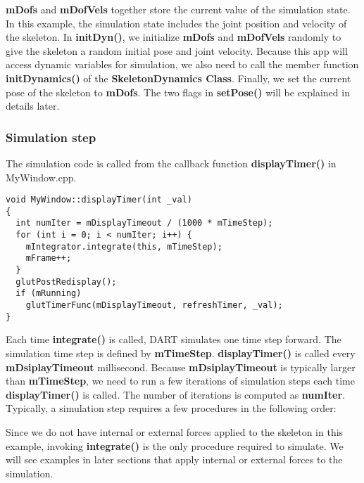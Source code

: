 \textbf{mDofs} and \textbf{mDofVels} together store the current value
of the simulation state. In this example, the simulation state
includes the joint position and velocity of the skeleton. In
\textbf{initDyn()}, we initialize \textbf{mDofs} and \textbf{mDofVels}
randomly to give the skeleton a random initial pose and joint
velocity. Because this app will access dynamic variables for
simulation, we also need to call the member function
\textbf{initDynamics()} of the \textbf{SkeletonDynamics
  Class}. Finally, we set the current pose of the skeleton to
\textbf{mDofs}. The two flags in \textbf{setPose()} will be explained
in details later.

\subsubsection{Simulation step}
The simulation code is called from the callback function
\textbf{displayTimer()} in MyWindow.cpp.

\ttfamily
\begin{lstlisting}[caption=MyWindows.cpp]
void MyWindow::displayTimer(int _val)
{
  int numIter = mDisplayTimeout / (1000 * mTimeStep);
  for (int i = 0; i < numIter; i++) {
    mIntegrator.integrate(this, mTimeStep);
    mFrame++;
  }
  glutPostRedisplay();
  if (mRunning)	
    glutTimerFunc(mDisplayTimeout, refreshTimer, _val);
}
\end{lstlisting}
\rmfamily Each time \textbf{integrate()} is called, DART simulates one
time step forward. The simulation time step is defined by
\textbf{mTimeStep}. \textbf{displayTimer()} is called every
\textbf{mDsiplayTimeout} millisecond. Because \textbf{mDsiplayTimeout}
is typically larger than \textbf{mTimeStep}, we need to run a few
iterations of simulation steps each time \textbf{displayTimer()} is
called. The number of iterations is computed as
\textbf{numIter}. Typically, a simulation step requires a few
procedures in the following order:


Since we do not have internal or external forces applied to the
skeleton in this example, invoking \textbf{integrate()} is the only
procedure required to simulate. We will see examples in later sections
that apply internal or external forces to the simulation.

